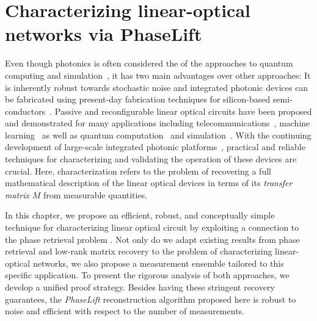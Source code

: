 \chapter{Characterizing linear-optical networks via PhaseLift}%
\label{chap:phaselift}


Even though photonics is often considered the  of the approaches to quantum computing and simulation~\cite{Rudolph_2016_Why}, it has two main advantages over other approaches:
It is inherently robust towards stochastic noise and integrated photonic devices can be fabricated using present-day fabrication techniques for silicon-based semi-conductors~\cite{Rudolph_2016_Why}.
Passive and reconfigurable linear optical circuits have been proposed and demonstrated for many applications including telecommunications~\cite{Miller_2015_Sorting}, machine learning~\cite{Shen_2017_Deep} as well as quantum computation~\cite{Carolan_2015_Universal} and simulation~\cite{Harris_2017_Quantum}.
With the continuing development of large-scale integrated photonic platforms~\cite{Silverstone_2016_Silicon,Seok_2016_LargeScale}, practical and reliable techniques for characterizing and validating the operation of these devices are crucial.
Here, characterization refers to the problem of recovering a full mathematical description of the linear optical devices in terms of its \emph{transfer matrix} $M$ from measurable quantities.

In this chapter, we propose an efficient, robust, and conceptually simple technique for characterizing linear optical circuit by exploiting a connection to the phase retrieval problem \cite{Walther_1963_Question}.
Not only do we adapt existing results from phase retrieval and low-rank matrix recovery to the problem of characterizing linear-optical networks, we also propose a measurement ensemble tailored to this specific application.
To present the rigorous analysis of both approaches, we develop a unified proof strategy.
Besides having these stringent recovery guarantees, the \emph{PhaseLift} reconstruction algorithm proposed here is robust to noise and efficient with respect to the number of measurements.

